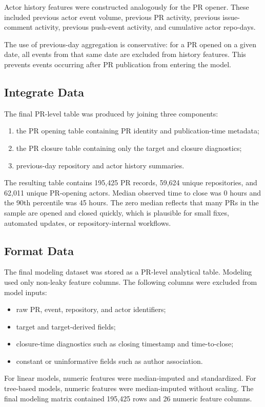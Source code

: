 Actor history features were constructed analogously for the PR opener. These included previous actor event
volume, previous PR activity, previous issue-comment activity, previous push-event activity, and cumulative
actor repo-days.

The use of previous-day aggregation is conservative: for a PR opened on a given date, all events from that
same date are excluded from history features. This prevents events occurring after PR publication from
entering the model.

\subsection{Integrate Data}

The final PR-level table was produced by joining three components:

\begin{enumerate}
    \item the PR opening table containing PR identity and publication-time metadata;
    \item the PR closure table containing only the target and closure diagnostics;
    \item previous-day repository and actor history summaries.
\end{enumerate}

The resulting table contains 195,425 PR records, 59,624 unique repositories, and 62,011 unique PR-opening
actors. Median observed time to close was 0 hours and the 90th percentile was 45 hours. The zero median
reflects that many PRs in the sample are opened and closed quickly, which is plausible for small fixes,
automated updates, or repository-internal workflows.

\subsection{Format Data}

The final modeling dataset was stored as a PR-level analytical table. Modeling used only non-leaky feature
columns. The following columns were excluded from model inputs:

\begin{itemize}
    \item raw PR, event, repository, and actor identifiers;
    \item target and target-derived fields;
    \item closure-time diagnostics such as closing timestamp and time-to-close;
    \item constant or uninformative fields such as author association.
\end{itemize}

For linear models, numeric features were median-imputed and standardized. For tree-based models, numeric
features were median-imputed without scaling. The final modeling matrix contained 195,425 rows and 26 numeric
feature columns.

